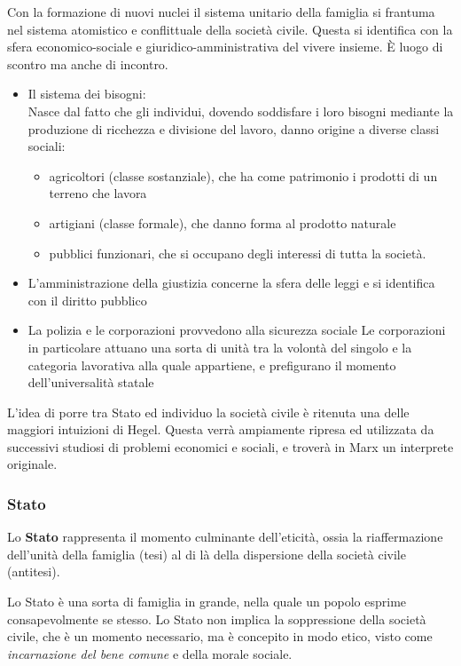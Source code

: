 \documentclass[a4paper, twoside, titlepage]{book}
\begin{document}
Con la formazione di nuovi nuclei il sistema unitario della famiglia si frantuma nel sistema atomistico e conflittuale della società civile. Questa si identifica con la sfera economico-sociale e giuridico-amministrativa del vivere insieme. È luogo di scontro ma anche di incontro.
\begin{itemize}
\item Il sistema dei bisogni:\\
	Nasce dal fatto che gli individui, dovendo soddisfare i loro bisogni mediante la produzione di ricchezza e divisione del lavoro, danno origine a diverse classi sociali:
	\begin{itemize}
		\item agricoltori (classe sostanziale), che ha come patrimonio i prodotti di un terreno che lavora
		\item artigiani (classe formale), che danno forma al prodotto naturale
		\item pubblici funzionari, che si occupano degli interessi di tutta la società.
	\end{itemize}
\item L'amministrazione della giustizia concerne la sfera delle leggi e si identifica con il diritto pubblico
\item La polizia e le corporazioni provvedono alla sicurezza sociale
Le corporazioni in particolare attuano una sorta di unità tra la volontà del singolo e la categoria lavorativa alla quale appartiene, e prefigurano il momento dell'universalità statale
\end{itemize}

L'idea di porre tra Stato ed individuo la società civile è ritenuta una delle maggiori intuizioni di Hegel. Questa verrà ampiamente ripresa ed utilizzata da successivi studiosi di problemi economici e sociali, e troverà in Marx un interprete originale.

\subsubsection{Stato}

Lo \textbf{Stato} rappresenta il momento culminante dell'eticità, ossia la riaffermazione dell'unità della famiglia (tesi) al di là della dispersione della società civile (antitesi).

Lo Stato è una sorta di famiglia in grande, nella quale un popolo esprime consapevolmente se stesso.
Lo Stato non implica la soppressione della società civile, che è un momento necessario, ma è concepito in modo etico, visto come \textit{incarnazione del bene comune} e della morale sociale.
\end{document}

